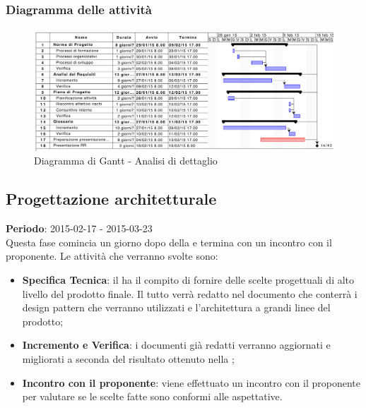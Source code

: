 		\subsubsection{Diagramma delle attività} %
		\label{ssub:diagramma_delle_attivita}
			\begin{figure}[htbp]
				\centering
				\centerline{\includegraphics[scale=0.7]{images/d_attivita_analisi_dettaglio.pdf}}
				\caption{Diagramma di Gantt - Analisi di dettaglio}
				\label{fig:gantt_analisi_dettaglio}				
			\end{figure}
	
	\subsection{Progettazione architetturale} %
	\label{sub:progettazione_architetturale}
	\textbf{Periodo}:  2015-02-17 - 2015-03-23 \\
	Questa fase comincia un giorno dopo della \RR{} e termina con un incontro con il proponente.
	Le attività che verranno svolte sono:
		\begin{itemize}
			\item \textbf{Specifica Tecnica}: il \roleDesigner{} ha il compito di fornire delle scelte progettuali di alto livello del prodotto finale. Il tutto verrà redatto nel documento \docNameVersionST{} che conterrà i design pattern che verranno utilizzati e l'architettura a grandi linee del prodotto;
			\item \textbf{Incremento e Verifica}: i documenti già redatti verranno aggiornati e migliorati a seconda del risultato ottenuto nella \RR;
			\item \textbf{Incontro con il proponente}: viene effettuato un incontro con il proponente per valutare se le scelte fatte sono conformi alle aspettative.
		\end{itemize}
		
